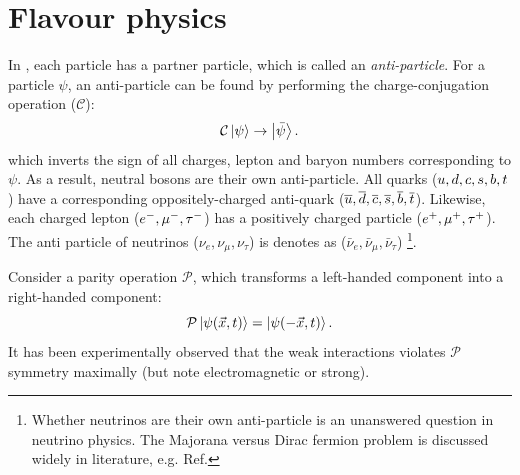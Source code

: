 \section{Flavour physics}\label{sec:flavour_physics}

In \SM, each particle has a partner particle, which is called an \textit{anti-particle}.
For a particle $\psi$, an anti-particle can be found by performing the charge-conjugation operation ($\mathcal{C}$):
\begin{equation}
    \mathcal{C}\ket{\psi}\rightarrow\ket{\bar{\psi}}.
\end{equation}
which inverts the sign of all charges, lepton and baryon numbers corresponding to $\psi$.
As a result, neutral bosons are their own anti-particle.
All quarks ($u,d,c,s,b,t$) have a corresponding oppositely-charged anti-quark ($\overline u,\overline d,\overline c,\overline s,\overline b,\overline t$).
Likewise, each charged lepton ($e^-,\mu^{-},\tau^-$) has a positively charged particle ($e^+,\mu^+,\tau^+$).
The anti particle of neutrinos ($\nu_{e},\nu_{\mu},\nu_{\tau}$) is denotes as ($\bar{\nu}_{e},\bar{\nu}_{\mu},\bar{\nu}_{\tau}$)
\footnote{Whether neutrinos are their own anti-particle is an unanswered question in neutrino physics. 
The Majorana versus Dirac fermion problem is discussed widely in literature, e.g. Ref\cite{Bilenky:2020vjk}.
}.

Consider a parity operation $\mathcal{P}$, which transforms a left-handed component into a right-handed component:
\begin{equation}
    \mathcal{P}\ket{\psi(\vec{x},t)} = \ket{\psi(-\vec{x},t)}.
\end{equation}
It has been experimentally observed that the weak interactions violates $\mathcal{P}$ symmetry maximally (but note electromagnetic or strong).

